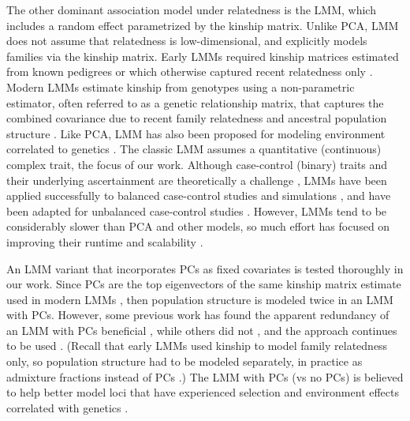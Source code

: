 \documentclass[11pt]{article}
\begin{document}
\begin{linenumbers}
The other dominant association model under relatedness is the LMM, which includes a random effect parametrized by the kinship matrix.
Unlike PCA, LMM does not assume that relatedness is low-dimensional, and explicitly models families via the kinship matrix.
Early LMMs required kinship matrices estimated from known pedigrees or which otherwise captured recent relatedness only \citep{yu_unified_2006, zhao_arabidopsis_2007}.
Modern LMMs estimate kinship from genotypes using a non-parametric estimator, often referred to as a genetic relationship matrix, that captures the combined covariance due to recent family relatedness and ancestral population structure \citep{kang_efficient_2008, astle_population_2009, ochoa_estimating_2021}.
Like PCA, LMM has also been proposed for modeling environment correlated to genetics \citep{vilhjalmsson_nature_2013, wang_trade-offs_2022}.
The classic LMM assumes a quantitative (continuous) complex trait, the focus of our work.
Although case-control (binary) traits and their underlying ascertainment are theoretically a challenge \citep{yang_advantages_2014}, LMMs have been applied successfully to balanced case-control studies \citep{astle_population_2009, kang_variance_2010} and simulations \citep{price_new_2010, wu_comparison_2011, sul_mixed_2013}, and have been adapted for unbalanced case-control studies \citep{zhou_efficiently_2018}.
However, LMMs tend to be considerably slower than PCA and other models, so much effort has focused on improving their runtime and scalability \citep{aulchenko_genomewide_2007, kang_efficient_2008, kang_variance_2010, zhang_mixed_2010, lippert_fast_2011, yang_gcta:_2011, listgarten_improved_2012, zhou_genome-wide_2012, svishcheva_rapid_2012, loh_efficient_2015, zhou_efficiently_2018}.

An LMM variant that incorporates PCs as fixed covariates is tested thoroughly in our work.
Since PCs are the top eigenvectors of the same kinship matrix estimate used in modern LMMs \citep{astle_population_2009, hoffman_correcting_2013, zhang_principal_2015}, then population structure is modeled twice in an LMM with PCs.
However, some previous work has found the apparent redundancy of an LMM with PCs beneficial \citep{price_new_2010, tucker_improving_2014, zhang_principal_2015}, while others did not \citep{liu_controlling_2011}, and the approach continues to be used \citep{zeng_signatures_2018, mbatchou_computationally_2021}.
(Recall that early LMMs used kinship to model family relatedness only, so population structure had to be modeled separately, in practice as admixture fractions instead of PCs \citep{yu_unified_2006, zhao_arabidopsis_2007}.)
The LMM with PCs (vs no PCs) is believed to help better model loci that have experienced selection \citep{price_new_2010, vilhjalmsson_nature_2013} and environment effects correlated with genetics \citep{zhang_principal_2015}.


\end{linenumbers}
\end{document}
